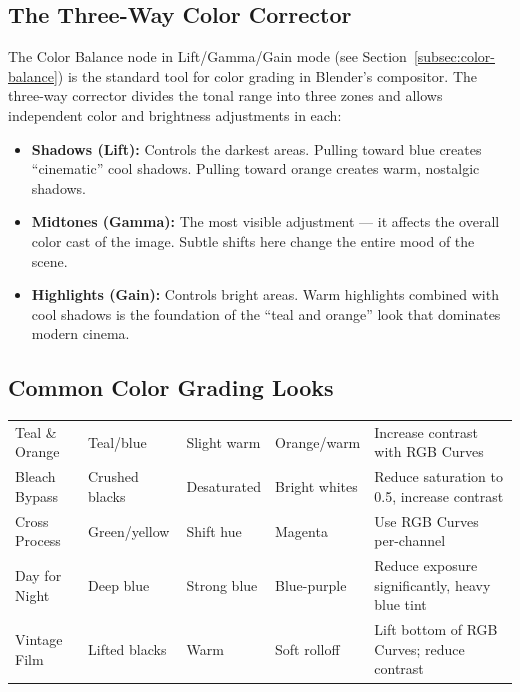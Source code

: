 \subsection{The Three-Way Color Corrector}

The Color Balance node in Lift/Gamma/Gain mode (see Section~\ref{subsec:color-balance}) is the standard tool for color grading in Blender's compositor. The three-way corrector divides the tonal range into three zones and allows independent color and brightness adjustments in each:

\begin{itemize}[leftmargin=2em]
  \item \textbf{Shadows (Lift):} Controls the darkest areas. Pulling toward blue creates ``cinematic'' cool shadows. Pulling toward orange creates warm, nostalgic shadows.
  \item \textbf{Midtones (Gamma):} The most visible adjustment --- it affects the overall color cast of the image. Subtle shifts here change the entire mood of the scene.
  \item \textbf{Highlights (Gain):} Controls bright areas. Warm highlights combined with cool shadows is the foundation of the ``teal and orange'' look that dominates modern cinema.
\end{itemize}

\subsection{Common Color Grading Looks}

\vspace{0.5em}
\begin{tabularx}{\textwidth}{l L{1.6cm} L{1.8cm} L{1.8cm} X}
\toprule
{}
 &  &  &  &  \\
\midrule
Teal \& Orange & Teal/blue & Slight warm & Orange/warm & Increase contrast with RGB Curves \\
Bleach Bypass & Crushed blacks & Desaturated & Bright whites & Reduce saturation to 0.5, increase contrast \\
Cross Process & Green/yellow & Shift hue & Magenta & Use RGB Curves per-channel \\
Day for Night & Deep blue & Strong blue & Blue-purple & Reduce exposure significantly, heavy blue tint \\
Vintage Film & Lifted blacks & Warm & Soft rolloff & Lift bottom of RGB Curves; reduce contrast \\
\bottomrule
\end{tabularx}
\vspace{0.5em}

